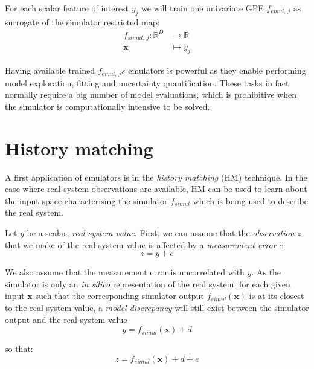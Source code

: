 \vspace{0.2cm}
For each scalar feature of interest $y_j$ we will train one univariate GPE $f_{emul,\,j}$ as surrogate of the simulator restricted map:
%
\begin{align}\label{eq:univariatesimulator}
    f_{simul,\,j}\colon\mathbb{R}^{D} &\to \mathbb{R} \\
    \mathbf{x} &\mapsto y_j \nonumber
\end{align}

\noindent
Having available trained $f_{emul,\,j}s$ emulators is powerful as they enable performing model exploration, fitting and uncertainty quantification. These tasks in fact normally require a big number of model evaluations, which is prohibitive when the simulator is computationally intensive to be solved.


%
%
%
\section{History matching}\label{sec:ch3hm}
A first application of emulators is in the \textit{history matching} (\acs{HM}) technique. In the case where real system observations are available, HM can be used to learn about the input space characterising the simulator $f_{simul}$ which is being used to describe the real system.

\vspace{0.2cm}
Let $y$ be a scalar, \textit{real system value}. First, we can assume that the \textit{observation} $z$ that we make of the real system value is affected by a \textit{measurement error} $e$:
%
\begin{equation}
z = y + e
\end{equation}

\noindent
We also assume that the measurement error is uncorrelated with $y$. As the simulator is only an \textit{in silico} representation of the real system, for each given input $\mathbf{x}$ such that the corresponding simulator output $f_{simul}(\mathbf{x})$ is at its closest to the real system value, a \textit{model discrepancy} will still exist between the simulator output and the real system value
%
\begin{equation}
y = f_{simul}(\mathbf{x}) + d
\end{equation}

\noindent
so that:
%
\begin{equation}
z = f_{simul}(\mathbf{x}) + d + e
\end{equation}

